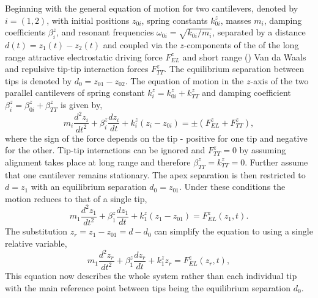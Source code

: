 \documentclass[12pt, a4paper, twoside]{book}
\begin{document}
Beginning with the general equation of motion for two cantilevers, denoted by $i=(1,2)$, with initial positions $z_{0i}$, spring constants $k_{0i}^z$, masses $m_i$, damping coefficients $\beta_i^z$, and resonant frequencies $\omega_{0i} = \sqrt{k_{0i}/m_i}$, separated by a distance $d(t) = z_1(t) - z_2(t)$ and coupled via the $z$-components of the of the long range attractive electrostatic driving force $F_{EL}^z$ and short range () Van da Waals and repulsive tip-tip interaction forces $F_{TT}^z$. The equilibrium separation between tips is denoted by $d_0 = z_{01} - z_{02}$. The equation of motion in the $z$-axis of the two parallel cantilevers of spring constant $k_i^z=k_{0i}^z+k_{TT}^z$ and damping coefficient $\beta_i^z=\beta_{0i}^z+\beta_{TT}^z$ is given by,
\begin{equation}
m_i\frac{d^2z_i}{dt^2}+\beta_i^z\frac{dz_i}{dt}+k_i^z\left(z_i-z_{0i}\right)=\pm\left(F_{EL}^z+F_{TT}^z\right),
\end{equation}
where the sign of the force depends on the tip - positive for one tip and negative for the other.
Tip-tip interactions can be ignored and $F_{TT}^z = 0$ by assuming alignment takes place at long range and therefore $\beta_{TT}^{z} = k_{TT}^{z} = 0$. Further assume that one cantilever remains stationary. The apex separation is then restricted to $d=z_1$ with an equilibrium separation $d_0 = z_{01}$. Under these conditions the motion reduces to that of a single tip,
\begin{equation}
m_1\frac{d^2z_1}{dt^2}+\beta_1^z\frac{dz_1}{dt}+k_1^z\left(z_1-z_{01}\right) = F_{EL}^z(z_1, t).
\label{eq:simple_eom_app}
\end{equation}
The substitution $z_r = z_1-z_{01} = d-d_{0}$ can simplify the equation to using a single relative variable,
\begin{equation}
m_1 \frac{d^2z_r}{dt^2} + \beta_1^z \frac{dz_r}{dt} + k_1^zz_r = F_{EL}^z(z_r, t),
\end{equation}
This equation now describes the whole system rather than each individual tip with the main reference point between tips being the equilibrium separation $d_0$.
\end{document}
